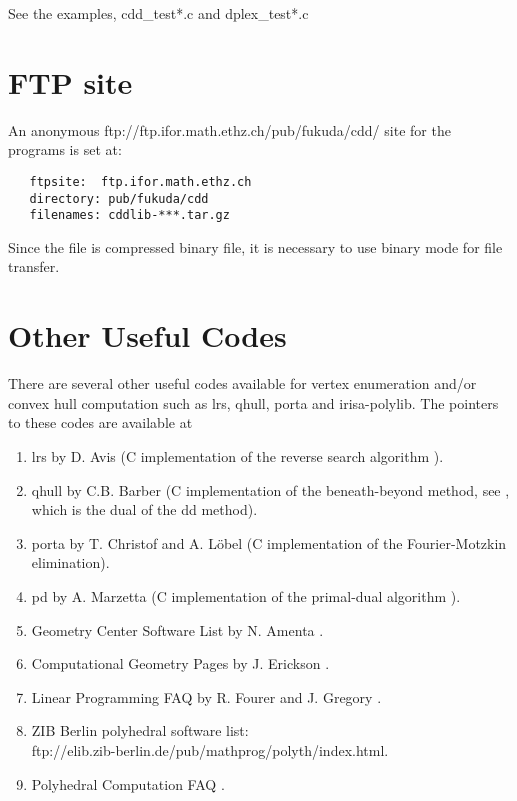 \documentclass[11pt]{article}
\begin{document}
See the examples, cdd\_test*.c and dplex\_test*.c


\section{FTP site}  \label{FTP}
An anonymous 
{ftp://ftp.ifor.math.ethz.ch/pub/fukuda/cdd/} site for the programs is set at:
\begin{verbatim}
   ftpsite:  ftp.ifor.math.ethz.ch
   directory: pub/fukuda/cdd
   filenames: cddlib-***.tar.gz
\end{verbatim}
Since the file is compressed binary file, it is necessary to use binary mode for
file transfer.

\section{Other Useful Codes}  \label{CODES}
There are several other useful codes available for vertex enumeration and/or
convex hull computation  such as lrs, qhull, porta and irisa-polylib.
The pointers to these codes are available at
\begin{enumerate}
\item lrs by D. Avis \cite{a-uglrs-97} (C implementation of the reverse search algorithm 
\cite{af-pachv-92}). 

\item qhull by C.B. Barber \cite{bdh-qach-95} (C implementation of
the beneath-beyond method, see \cite{e-acg-87,m-cg-94},
which is the dual of the dd method). 

\item porta by T. Christof and A. L\"obel \cite{cl-porta-97} (C implementation
of the Fourier-Motzkin elimination).

\item pd by A. Marzetta \cite{m-pdcip-97} (C implementation of the primal-dual algorithm 
\cite{bfm-pdmvf-97}). 

 \item Geometry Center Software List by N. Amenta \cite{a-dcg}.

 \item Computational Geometry Pages by J. Erickson \cite{e-cgp}.

 \item Linear Programming FAQ by R. Fourer and J. Gregory \cite{fg-lpfaq-97}.

 \item ZIB Berlin polyhedral software list:\\
{ftp://elib.zib-berlin.de/pub/mathprog/polyth/index.html}.

\item Polyhedral Computation FAQ \cite{f-pcfaq-98}.
\end{enumerate}
\end{document}

